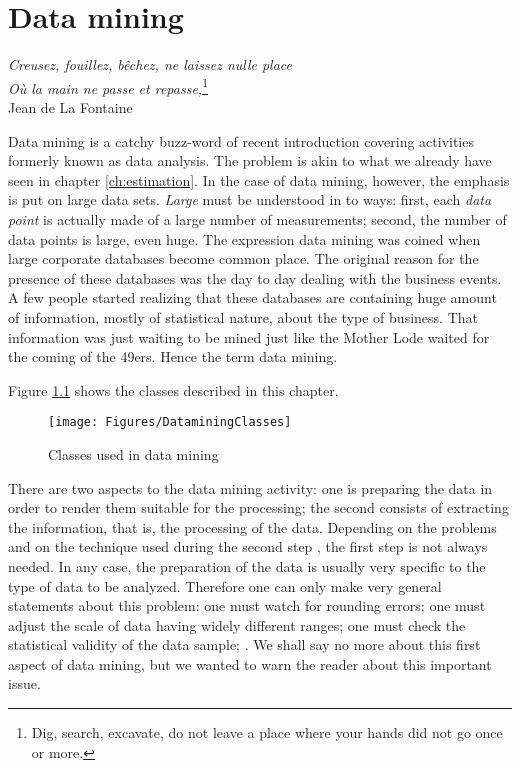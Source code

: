 %
%

\chapter{Data mining} \vspace{1 ex}
\begin{flushright} \textsl{Creusez, fouillez, bêchez, ne laissez nulle place}\\
\textsl{Où la main ne passe et repasse,}\footnote{Dig, search,
excavate, do not leave a place where your hands did not go once or
more.}\\ Jean de La Fontaine
\end{flushright}
\vspace{1 ex} \label{ch:datamining} Data mining is a catchy
buzz-word of recent introduction covering activities formerly
known as data analysis. The problem is akin to what we already
have seen in chapter \ref{ch:estimation}. In the case of data
mining, however, the emphasis is put on large data sets. \textsl
{Large} must be understood in to ways: first, each \textsl{data point}
is actually made of a large number of measurements; second, the
number of data points is large, even huge. The expression data
mining was coined when large corporate databases become common
place. The original reason for the presence of these databases was
the day to day dealing with the business events. A few people
started realizing that these databases are containing huge amount
of information, mostly of statistical nature, about the type of
business. That information was just waiting to be mined just like
the Mother Lode waited for the coming of the 49ers. Hence the term
data mining.

Figure \ref{fig:dataminingclasses} shows the classes described in
this chapter.
\begin{figure}
\centering\texttt{[image: Figures/DataminingClasses]}
\caption{Classes used in data mining}\label{fig:dataminingclasses}
\end{figure}
There are two aspects to the data mining activity: one is
preparing the data in order to render them suitable for the
processing; the second consists of extracting the information,
that is, the processing of the data. Depending on the problems and
on the technique used during the second step , the first step is
not always needed. In any case, the preparation of the data is
usually very specific to the type of data to be analyzed.
Therefore one can only make very general statements about this
problem: one must watch for rounding errors; one must adjust the
scale of data having widely different ranges; one must check the
statistical validity of the data sample; \etc. We shall say no
more about this first aspect of data mining, but we wanted to warn
the reader about this important issue.


